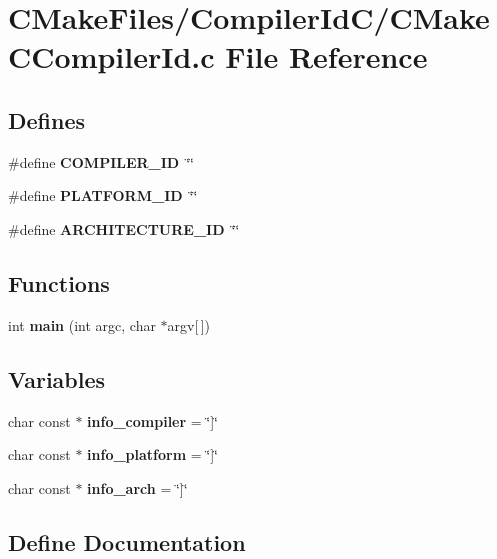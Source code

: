 \section{\-C\-Make\-Files/\-Compiler\-Id\-C/\-C\-Make\-C\-Compiler\-Id.c \-File \-Reference}
\label{CMakeCCompilerId_8c}
\subsection*{\-Defines}
\begin{DoxyCompactItemize}
\item 
\#define {\bf \-C\-O\-M\-P\-I\-L\-E\-R\-\_\-\-I\-D}~\char`\"{}\char`\"{}
\item 
\#define {\bf \-P\-L\-A\-T\-F\-O\-R\-M\-\_\-\-I\-D}~\char`\"{}\char`\"{}
\item 
\#define {\bf \-A\-R\-C\-H\-I\-T\-E\-C\-T\-U\-R\-E\-\_\-\-I\-D}~\char`\"{}\char`\"{}
\end{DoxyCompactItemize}
\subsection*{\-Functions}
\begin{DoxyCompactItemize}
\item 
int {\bf main} (int argc, char $\ast$argv[$\,$])
\end{DoxyCompactItemize}
\subsection*{\-Variables}
\begin{DoxyCompactItemize}
\item 
char const $\ast$ {\bf info\-\_\-compiler} = \char`\"{}]\char`\"{}
\item 
char const $\ast$ {\bf info\-\_\-platform} = \char`\"{}]\char`\"{}
\item 
char const $\ast$ {\bf info\-\_\-arch} = \char`\"{}]\char`\"{}
\end{DoxyCompactItemize}


\subsection{\-Define \-Documentation}
